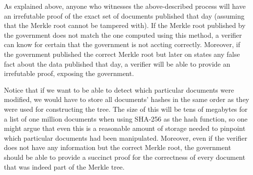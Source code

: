 As explained above, anyone who witnesses the above-described process will have an irrefutable proof of the exact set of documents published that day (assuming that the Merkle root cannot be tampered with). If the Merkle root published by the government does not match the one computed using this method, a verifier can know for certain that the government is not accting correctly. Moreover, if the government published the correct Merkle root but later on states any false fact about the data published that day, a verifier will be able to provide an irrefutable proof, exposing the government.

Notice that if we want to be able to detect which particular documents were modified, we would have to store all documents' hashes in the same order as they were used for constructing the tree. The size of this will be tens of megabytes for a list of one million documents when using SHA-256 as the hash function, so one might argue that even this is a reasonable amount of storage needed to pinpoint which particular documents had been manipulated. Moreover, even if the verifier does not have any information but the correct Merkle root, the government should be able to provide a succinct proof for the correctness of every document that was indeed part of the Merkle tree.

